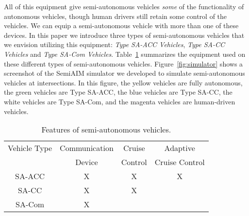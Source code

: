 All of this equipment give semi-autonomous vehicles \emph{some} of
the functionality of autonomous vehicles, though human drivers still
retain some control of the vehicles.  We can equip a semi-autonomous
vehicle with more than one of these devices. In this paper we introduce three
types of semi-autonomous vehicles that we envision utilizing this
equipment: \textit{Type SA-ACC Vehicles}, \textit{Type SA-CC Vehicles}
and \textit{Type SA-Com Vehicles}.  Table~\ref{table:type} summarizes
the equipment used on these different types of semi-autonomous
vehicles.  Figure~\ref{fig:simulator} shows a screenshot of the
SemiAIM simulator we developed to simulate semi-autonomous vehicles at
intersections. In this figure, the yellow vehicles are fully
autonomous, the green vehicles are Type SA-ACC, the blue vehicles are
Type SA-CC, the white vehicles are Type SA-Com, and the magenta
vehicles are human-driven vehicles.



\begin{table}
\centering
\caption{Features of semi-autonomous vehicles.}
\label{table:type}
\small
\vspace{-.1in}
\begin{tabular}{|c|c|c|c|}
  \hline
  Vehicle Type & Communication & Cruise & Adaptive \\
               & Device & Control & Cruise Control \\
  \hline
  SA-ACC & X & X & X  \\
  SA-CC & X & X &  \\
  SA-Com & X & &  \\
  \hline
\end{tabular}
\vspace{-.3in}
\end{table}

